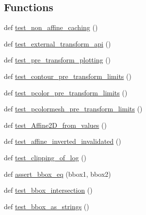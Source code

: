 \subsection*{Functions}
\begin{DoxyCompactItemize}
\item 
def \hyperlink{namespacematplotlib_1_1tests_1_1test__transforms_ac11ff1162a34576b3e1a0e5bfd4a5861}{test\+\_\+non\+\_\+affine\+\_\+caching} ()
\item 
def \hyperlink{namespacematplotlib_1_1tests_1_1test__transforms_af7b8b5bddb045c5b1036c0887213dbad}{test\+\_\+external\+\_\+transform\+\_\+api} ()
\item 
def \hyperlink{namespacematplotlib_1_1tests_1_1test__transforms_aede83cf196cbb0fa5e258bd755c7f1a7}{test\+\_\+pre\+\_\+transform\+\_\+plotting} ()
\item 
def \hyperlink{namespacematplotlib_1_1tests_1_1test__transforms_ad12c5ce29926e0af955866ab5d1caee5}{test\+\_\+contour\+\_\+pre\+\_\+transform\+\_\+limits} ()
\item 
def \hyperlink{namespacematplotlib_1_1tests_1_1test__transforms_a21e765a73e715a1165b49a27a8de5a72}{test\+\_\+pcolor\+\_\+pre\+\_\+transform\+\_\+limits} ()
\item 
def \hyperlink{namespacematplotlib_1_1tests_1_1test__transforms_a7380b9147a484fff8305d3903b3ee33b}{test\+\_\+pcolormesh\+\_\+pre\+\_\+transform\+\_\+limits} ()
\item 
def \hyperlink{namespacematplotlib_1_1tests_1_1test__transforms_a5e5311defd41ef09247cb6e18bbfd8ad}{test\+\_\+\+Affine2\+D\+\_\+from\+\_\+values} ()
\item 
def \hyperlink{namespacematplotlib_1_1tests_1_1test__transforms_a9618583814311cd9ce4e06bef2bc3c91}{test\+\_\+affine\+\_\+inverted\+\_\+invalidated} ()
\item 
def \hyperlink{namespacematplotlib_1_1tests_1_1test__transforms_a759c82d0042adb7d9f0f53732deb48af}{test\+\_\+clipping\+\_\+of\+\_\+log} ()
\item 
def \hyperlink{namespacematplotlib_1_1tests_1_1test__transforms_a087063eec29245d49a6f20284f10ff2c}{assert\+\_\+bbox\+\_\+eq} (bbox1, bbox2)
\item 
def \hyperlink{namespacematplotlib_1_1tests_1_1test__transforms_a3d4b9099f9bbf7cda840ac344755808c}{test\+\_\+bbox\+\_\+intersection} ()
\item 
def \hyperlink{namespacematplotlib_1_1tests_1_1test__transforms_a215c6cef27e3f457181b814f58072f77}{test\+\_\+bbox\+\_\+as\+\_\+strings} ()
\item 

\end{DoxyCompactItemize}
